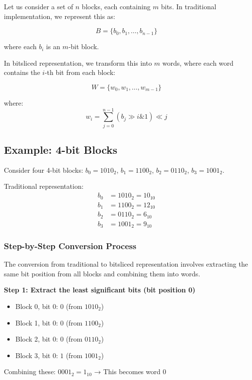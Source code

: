 \documentclass[11pt,a4paper]{article}
\begin{document}
Let us consider a set of $n$ blocks, each containing $m$ bits. In traditional implementation, we represent this as:

\begin{equation}
B = \{b_0, b_1, \ldots, b_{n-1}\}
\end{equation}

where each $b_i$ is an $m$-bit block.

In bitsliced representation, we transform this into $m$ words, where each word contains the $i$-th bit from each block:

\begin{equation}
W = \{w_0, w_1, \ldots, w_{m-1}\}
\end{equation}

where:
\begin{equation}
w_i = \sum_{j=0}^{n-1} (b_j \gg i \& 1) \ll j
\end{equation}

\subsection{Example: 4-bit Blocks}

Consider four 4-bit blocks: $b_0 = 1010_2$, $b_1 = 1100_2$, $b_2 = 0110_2$, $b_3 = 1001_2$.

Traditional representation:
\begin{align}
b_0 &= 1010_2 = 10_{10} \\
b_1 &= 1100_2 = 12_{10} \\
b_2 &= 0110_2 = 6_{10} \\
b_3 &= 1001_2 = 9_{10}
\end{align}

\subsubsection{Step-by-Step Conversion Process}

The conversion from traditional to bitsliced representation involves extracting the same bit position from all blocks and combining them into words.

\textbf{Step 1: Extract the least significant bits (bit position 0)}
\begin{itemize}
    \item Block 0, bit 0: $0$ (from $1010_2$)
    \item Block 1, bit 0: $0$ (from $1100_2$)
    \item Block 2, bit 0: $0$ (from $0110_2$)
    \item Block 3, bit 0: $1$ (from $1001_2$)
\end{itemize}
Combining these: $0001_2 = 1_{10}$ → This becomes word 0
\end{document}

